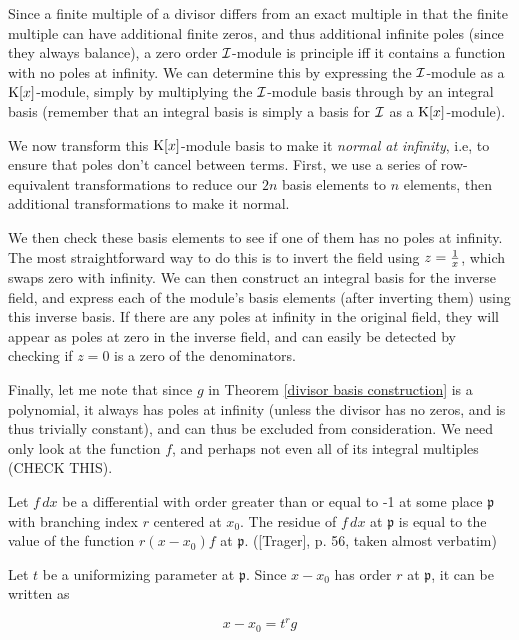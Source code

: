 Since a finite multiple of a divisor differs from an exact multiple in
that the finite multiple can have additional finite zeros, and thus
additional infinite poles (since they always balance), a zero order
${\cal I}$-module is principle iff it contains a function with no
poles at infinity.  We can determine this by expressing the ${\cal
I}$-module as a ${\rm K}[x]$-module, simply by multiplying the ${\cal
I}$-module basis through by an integral basis (remember that an
integral basis is simply a basis for ${\cal I}$ as a ${\rm
K}[x]$-module).

We now transform this ${\rm K}[x]$-module basis to make it {\it normal
at infinity}, i.e, to ensure that poles don't cancel between terms.
First, we use a series of row-equivalent transformations to reduce our
$2n$ basis elements to $n$ elements, then additional transformations
to make it normal.

We then check these basis elements to see if one of them has no poles
at infinity.  The most straightforward way to do this is to invert the
field using $z={1\over x}$, which swaps zero with infinity.  We can
then construct an integral basis for the inverse field, and express
each of the module's basis elements (after inverting them) using this
inverse basis.  If there are any poles at infinity in the original
field, they will appear as poles at zero in the inverse field, and can
easily be detected by checking if $z=0$ is a zero of the denominators.

Finally, let me note that since $g$ in Theorem \ref{divisor basis
construction} is a polynomial, it always has poles at infinity (unless
the divisor has no zeros, and is thus trivially constant), and can
thus be excluded from consideration.  We need only look at the
function $f$, and perhaps not even all of its integral multiples
(CHECK THIS).

\theorem
\label{Trager's residue theorem}

Let $f \,dx$ be a differential with order greater than or equal to -1
at some place $\mathfrak{p}$ with branching index $r$ centered at
$x_0$.  The residue of $f \,dx$ at $\mathfrak{p}$ is equal to the
value of the function $r(x-x_0)f$ at $\mathfrak{p}$. ([Trager], p. 56,
taken almost verbatim)

\proof

Let $t$ be a uniformizing parameter at $\mathfrak{p}$.  Since
$x-x_0$ has order $r$ at $\mathfrak{p}$, it can be written as

$$x-x_0 = t^r g$$

